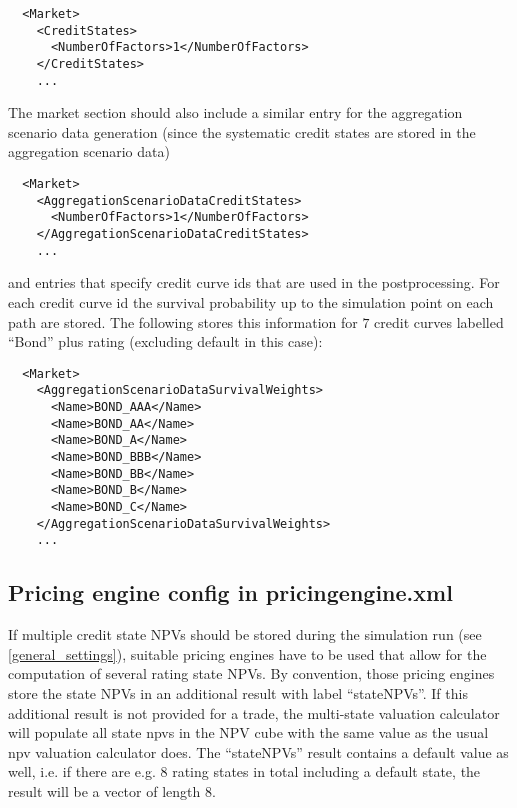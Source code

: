\documentclass[12pt, a4paper]{article}
\begin{document}
\begin{verbatim}
  <Market>
    <CreditStates>
      <NumberOfFactors>1</NumberOfFactors>
    </CreditStates>
    ...
\end{verbatim}

The market section should also include a similar entry for the aggregation scenario data generation (since the systematic credit states are stored in the aggregation scenario data)

\begin{verbatim}
  <Market>
    <AggregationScenarioDataCreditStates>
      <NumberOfFactors>1</NumberOfFactors>
    </AggregationScenarioDataCreditStates>
    ...
\end{verbatim}

and entries that specify credit curve ids that are used in the postprocessing. For each credit curve id the survival probability up to the simulation point on each path are stored. The following stores this information for $7$ credit curves labelled ``Bond'' plus rating (excluding default in this case):

\begin{verbatim}
  <Market>
    <AggregationScenarioDataSurvivalWeights>
      <Name>BOND_AAA</Name>
      <Name>BOND_AA</Name>
      <Name>BOND_A</Name>
      <Name>BOND_BBB</Name>
      <Name>BOND_BB</Name>
      <Name>BOND_B</Name>
      <Name>BOND_C</Name>
    </AggregationScenarioDataSurvivalWeights>
    ...
\end{verbatim}

\subsection{Pricing engine config in pricingengine.xml}\label{pricing_engine_config}

If multiple credit state NPVs should be stored during the simulation run (see \ref{general_settings}), suitable pricing
engines have to be used that allow for the computation of several rating state NPVs. By convention, those pricing
engines store the state NPVs in an additional result with label ``stateNPVs''. If this additional result is not provided
for a trade, the multi-state valuation calculator will populate all state npvs in the NPV cube with the same value as
the usual npv valuation calculator does. The ``stateNPVs'' result contains a default value as well, i.e. if there are
e.g. $8$ rating states in total including a default state, the result will be a vector of length 8.
\end{document}
